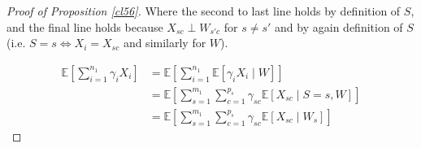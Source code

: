 \begin{proof}[Proof of Proposition \ref{cl56}]





%
Where the second to last line holds by definition of $S$, and the final line holds because $X_{sc} \perp W_{s'c}$ for $s \ne s'$ and by again definition of $S$ (i.e. $S = s \Leftrightarrow X_i = X_{sc}$ and similarly for $W$).


\begin{align*}
    \mathbb{E}[\sum_{i=1}^{n_1} \gamma_iX_i] &= \mathbb{E}[\sum_{i=1}^{n_1} \mathbb{E}[\gamma_iX_i \mid W]] \\
    &= \mathbb{E}[\sum_{s=1}^{m_1}\sum_{c=1}^{p_s} \gamma_{sc} \mathbb{E}[X_{sc} \mid S = s, W]] \\
    &= \mathbb{E}[\sum_{s=1}^{m_1}\sum_{c=1}^{p_s} \gamma_{sc} \mathbb{E}[X_{sc} \mid W_s]]
\end{align*}
%

\end{proof}    
    


